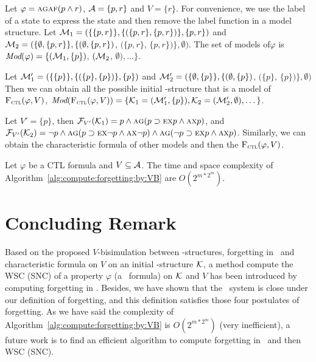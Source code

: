 \documentclass{article}
\begin{document}
\begin{example}
Let $\varphi=\textsc{a}\textsc{g} \textsc{a}\textsc{f} (p \wedge r)$, ${\cal A}=\{p,r\}$ and $V=\{r\}$. For convenience, we use the label of a state to express the state and then remove the label function in a model structure.
Let ${\cal M}_1=(\{\{p,r\}\}, \{(\{p,r\}, \{p,r\})\}, \{p,r\})$ and ${\cal M}_2=(\{\emptyset,\{p,r\}\}, \{(\emptyset, \{p,r\})$, $(\{p,r\}$, $\{p,r\})\}, \emptyset)$.
The set of models of$\varphi$ is $\textit{Mod}(\varphi)=\{({\cal M}_1, \{p\})$, $({\cal M}_2$, $\emptyset), \dots\}$.

Let ${\cal M}_1'=(\{\{p\}\}, \{(\{p\}, \{p\})\}, \{p\})$ and ${\cal M}_2'=(\{\emptyset,\{p\}\}, \{(\emptyset, \{p\})$, $(\{p\}$, $\{p\})\}, \emptyset)$
  Then we can obtain all the possible initial \MPK-structure that is a model of ${\textsc{F}_{\textsc{ctl}}}(\varphi, V)$, \ie $\textit{Mod}({\textsc{F}_{\textsc{ctl}}}(\varphi, V)) =\{{\cal K}_1=({\cal M}_1', \{p\}), {\cal K}_2=({\cal M}_2', \emptyset), \dots\}$.

Let $V'=\{p\}$, then
 ${\cal F}_{V'}({\cal K}_1)= p \wedge \textsc{a}\textsc{g} (p\supset \textsc{e} \textsc{x} p \wedge \textsc{a} \textsc{x} p)$,
 and
 ${\cal F}_{V'}({\cal K}_2)=\neg p\wedge \textsc{a}\textsc{g} (p\supset \textsc{e} \textsc{x} \neg p \wedge \textsc{a} \textsc{x} \neg p) \wedge \textsc{a}\textsc{g} (\neg p\supset \textsc{e} \textsc{x} p \wedge \textsc{a} \textsc{x} p)$. Similarly, we can obtain the characteristic formula of other models and then the ${\textsc{F}_{\textsc{ctl}}}(\varphi, V)$.%
\end{example}

\begin{proposition}\label{pro:time:alg1}
 Let $\varphi$ be a CTL formula and $V\subseteq {\cal A}$. The time and space complexity of
Algorithm~\ref{alg:compute:forgetting:by:VB} are $O(2^{m*2^m})$.%
\end{proposition}

\section{Concluding Remark}
Based on the proposed $V$-bisimulation between \MPK-structures,  forgetting in \CTL\ and characteristic formula on $V$ on an initial \MPK-structure $\cal K$,
a method compute the WSC (SNC) of a property $\varphi$ (a \CTL\ formula) on $\cal K$ and $V$ has been introduced by computing forgetting in \CTL.
Besides, we have shown that the \CTL\ system is close under
our definition of forgetting, and this definition satisfies those four postulates of forgetting.
As we have said the complexity of Algorithm~\ref{alg:compute:forgetting:by:VB} is $O(2^{m*2^m})$ (very inefficient), a future
work is to find an efficient algorithm to compute forgetting in \CTL\ and then WSC (SNC).
\end{document}
